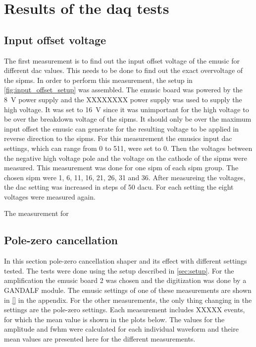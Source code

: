 \chapter{Results of the \ac{daq} tests}


\section{Input offset voltage}
The first measurement is to find out the input offset voltage of the \ac{emusic} for different \ac{dac} values.
This needs to be done to find out the exact overvoltage of the \acp{sipm}.
In order to perform this measurement, the setup in \autoref{fig:input_offset_setup} was assembled.
The \ac{emusic} board was powered by the \SI{8}{\volt} power supply and the XXXXXXXX power supply was used to supply the high voltage.
It was set to \SI{16}{\volt} since it was unimportant for the high voltage to be over the breakdown voltage of the \acp{sipm}.
It should only be over the maximum input offset the \ac{emusic} can generate for the resulting voltage to be applied in reverse direction to the \acp{sipm}.
For this measurement the \ac{emusic}s input \ac{dac} settings, which can range from 0 to 511, were set to 0.
Then the voltages between the negative high voltage pole and the voltage on the cathode of the \acp{sipm} were measured.
This measurement was done for one \ac{sipm} of each \ac{sipm} group.
The chosen \ac{sipm} were 1, 6, 11, 16, 21, 26, 31 and 36.
After measureing the voltages, the \ac{dac} setting was increased in steps of 50 \ac{dac}u.
For each setting the eight voltages were measured again.

The measurement for 




\section{Pole-zero cancellation}

In this section pole-zero cancellation shaper and its effect with different settings tested.
The tests were done using the setup described in \autoref{sec:setup}.
For the amplification the \ac{emusic} board 2 was chosen and the digitization was done by a GANDALF module.
The \ac{emusic} settings of one of these measurements are shown in \autoref{} in the appendix.
For the other measurements, the only thing changing in the settings are the pole-zero settings.
Each measurement includes XXXXX events, for which the mean value is shown in the plots below.
The values for the amplitude and \ac{fwhm} were calculated for each individual waveform and theire mean values are presented here for the different measurements.

